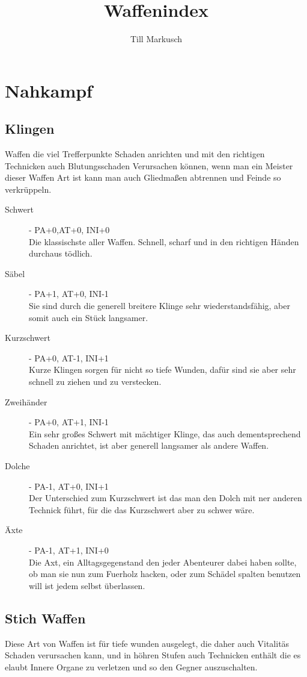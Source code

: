 \documentclass[a4paper,12pt,oneside]{book}
\title{Waffenindex}
\author{Till Markusch}
\date{}
\begin{document}
\maketitle
\tableofcontents

\chapter{Nahkampf}

\section{Klingen}
Waffen die viel Trefferpunkte Schaden anrichten und mit den richtigen Technicken auch Blutungsschaden Verursachen können, wenn man ein Meister dieser Waffen Art ist kann man auch Gliedmaßen abtrennen und Feinde so verkrüppeln.

\begin{description}
\item[Schwert]- PA+0,AT+0, INI+0
\\Die klassischste aller Waffen. Schnell, scharf und in den richtigen Händen durchaus tödlich.
\item[Säbel]- PA+1, AT+0, INI-1
\\Sie sind durch die generell breitere Klinge sehr wiederstandsfähig, aber somit auch ein Stück langsamer.
\item[Kurzschwert] - PA+0, AT-1, INI+1
\\Kurze Klingen sorgen für nicht so tiefe Wunden, dafür sind sie aber sehr schnell zu ziehen und zu verstecken.
\item[Zweihänder] - PA+0, AT+1, INI-1
\\Ein sehr großes Schwert mit mächtiger Klinge, das auch dementsprechend Schaden anrichtet, ist aber generell langsamer als andere Waffen.
\item[Dolche] - PA-1, AT+0, INI+1
\\Der Unterschied zum Kurzschwert ist das man den Dolch mit ner anderen Technick führt, für die das Kurzschwert aber zu schwer wäre.
\item[Äxte] - PA-1, AT+1, INI+0
\\Die Axt, ein Alltagsgegenstand den jeder Abenteurer dabei haben sollte, ob man sie nun zum Fuerholz hacken, oder zum Schädel spalten benutzen will ist jedem selbst überlassen.
\end{description}

\section{Stich Waffen}
Diese Art von Waffen ist für tiefe wunden ausgelegt, die daher auch Vitalitäs Schaden verursachen kann, und in höhren Stufen auch Technicken 
   enthält die es elaubt Innere Organe zu verletzen und so den Gegner auszuschalten.
\end{document}
